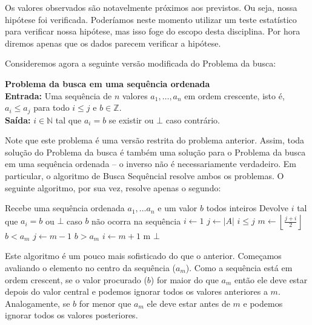 Os valores observados são notavelmente próximos aos previstos.
Ou seja, nossa hipótese foi verificada.
Poderíamos neste momento utilizar um teste estatístico para verificar nossa hipótese, mas isso foge do escopo desta disciplina.
Por hora diremos apenas que os dados parecem verificar a hipótese.

Consideremos agora a seguinte versão modificada do Problema da busca:

\vspace{0.5cm}

{\bf Problema da busca em uma sequência ordenada}\\

{\bf Entrada:} Uma sequência de $n$ valores $a_1, \dots, a_n$ em ordem crescente, isto é, $a_i \leq a_j$ para todo $i \leq j$ e $b \in \mathbb{Z}$.\\

{\bf Saída:} $i \in \mathbb{N}$ tal que $a_i = b$ se existir ou $\bot$ caso contrário.

\vspace{0.5cm}

Note que este problema é uma versão restrita do problema anterior.
Assim, toda solução do Problema da busca é também uma solução para o Problema da busca em uma sequência ordenada -- o inverso não é necessariamente verdadeiro.
Em particular, o algoritmo de Busca Sequêncial resolve ambos os problemas.
O seguinte algoritmo, por sua vez, resolve apenas o segundo:

\begin{codebox}
  \li \Comment Recebe uma sequência ordenada $a_1, \dots a_n$ e um valor $b$ todos inteiros
  \li \Comment Devolve $i$ tal que $a_i = b$ ou $\bot$ caso $b$ não ocorra na sequência
  \li $i \gets 1$
  \li $j \gets |A|$
  \li \While $i \leq j$
  \li \Do $m \gets \left \lfloor{\frac{j+i}{2}}\right\rfloor$
  \li \If $b < a_m$
  \li     \Then $j \gets m - 1$
  \li \Else
      \If $b > a_m$
  \li      \Then $i \gets m + 1$
  \li \Else \Return m 
      \End
  \End
  \End
  \li \Return $\bot$
\end{codebox}

Este algoritmo é um pouco mais sofisticado do que o anterior.
Começamos avaliando o elemento no centro da sequência ($a_m$).
Como a sequência está em ordem crescent, se o valor procurado ($b$) for maior do que $a_m$ então ele deve estar depois do valor central e podemos ignorar todos os valores anteriores a $m$.
Analogamente, se $b$ for menor que $a_m$ ele deve estar antes de $m$ e podemos ignorar todos os valores posteriores.

